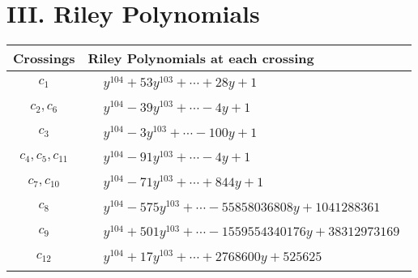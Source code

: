 \documentclass[1p]{elsarticle_modified}
\theoremstyle{definition}
\begin{document}
\centering \section*{ III. Riley Polynomials}
\begin{tabular}{m{50pt}|m{274pt}}
Crossings & \hspace{64pt}Riley Polynomials at each crossing \\
\hline $$\begin{aligned}c_{1}\end{aligned}$$&$\begin{aligned}
&y^{104}+53 y^{103}+\cdots+28 y+1
\end{aligned}$\\
\hline $$\begin{aligned}c_{2},c_{6}\end{aligned}$$&$\begin{aligned}
&y^{104}-39 y^{103}+\cdots-4 y+1
\end{aligned}$\\
\hline $$\begin{aligned}c_{3}\end{aligned}$$&$\begin{aligned}
&y^{104}-3 y^{103}+\cdots-100 y+1
\end{aligned}$\\
\hline $$\begin{aligned}c_{4},c_{5},c_{11}\end{aligned}$$&$\begin{aligned}
&y^{104}-91 y^{103}+\cdots-4 y+1
\end{aligned}$\\
\hline $$\begin{aligned}c_{7},c_{10}\end{aligned}$$&$\begin{aligned}
&y^{104}-71 y^{103}+\cdots+844 y+1
\end{aligned}$\\
\hline $$\begin{aligned}c_{8}\end{aligned}$$&$\begin{aligned}
&y^{104}-575 y^{103}+\cdots-55858036808 y+1041288361
\end{aligned}$\\
\hline $$\begin{aligned}c_{9}\end{aligned}$$&$\begin{aligned}
&y^{104}+501 y^{103}+\cdots-1559554340176 y+38312973169
\end{aligned}$\\
\hline $$\begin{aligned}c_{12}\end{aligned}$$&$\begin{aligned}
&y^{104}+17 y^{103}+\cdots+2768600 y+525625
\end{aligned}$\\
\hline
\end{tabular}
\vskip 2pc
\end{document}
